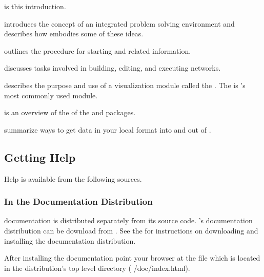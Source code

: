 \begin{description}
  \item {} is this introduction.
  \item {} introduces the concept of an
        integrated problem solving environment  and describes how \SR{}
        embodies some of these ideas.
  \item {}  outlines the procedure for
        starting \sr{} and related information.
  \item {} discusses tasks
        involved in building, editing, and executing networks.
  \item {} describes the
        purpose and use of a visualization module called the \viewer{}.  The
        \viewer{} is \sr{}'s most commonly used module.
  \item {} is an overview of the 
        of the \sr{} and \biopse{} packages.
  \item {} summarize ways to
        get data in your local format into and out of \SR{}.
\end{description}

\subsection{Getting Help}
\label{sec:help}

Help is available from the following sources.

\subsubsection{In the Documentation Distribution}

\sr{} documentation is distributed separately from its source code.
\sr{}'s documentation distribution can be download from
.  See the \sr{}
 for
instructions on downloading and installing the documentation
distribution.

After installing the documentation point your browser at the
 file which is located in the distribution's top
level  directory (\ie{} /doc/index.html).

